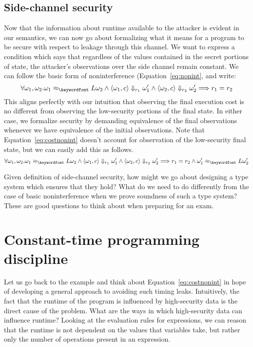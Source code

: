 \documentclass[11pt,twoside]{scrartcl}
\begin{document}
\subsection{Side-channel security}

Now that the information about runtime available to the attacker is evident in our semantics, we can now go about formalizing what it means for a program to be secure with respect to leakage through this channel. We want to express a condition which says that regardless of the values contained in the secret portions of state, the attacker's observations over the side channel remain constant. We can follow the basic form of noninterference (Equation~\ref{eq:nonint}, and write:
\begin{equation}
\label{eq:costnonint}
\forall \omega_1,\omega_2 . \omega_1 \approx_\lowt \omega_2 \land \langle \omega_1, c\rangle \Downarrow_{r_1} \omega_1' \land \langle\omega_2, c\rangle\Downarrow_{r_2}\omega_2' \Longrightarrow r_1 = r_2
\end{equation}
This aligns perfectly with our intuition that observing the final execution cost is no different from observing the low-security portions of the final state. In either case, we formalize security by demanding equivalence of the final observations whenever we have equivalence of the initial observations. Note that Equation~\ref{eq:costnonint} doesn't account for observation of the low-security final state, but we can easily add this as follows.
\begin{equation}
\label{eq:costfull}
\forall \omega_1,\omega_2 . \omega_1 \approx_\lowt \omega_2 \land \langle \omega_1, c\rangle \Downarrow_{r_1} \omega_1' \land \langle\omega_2, c\rangle\Downarrow_{r_2}\omega_2' \Longrightarrow r_1 = r_2 \land \omega_1' \approx_\lowt \omega_2'
\end{equation}

Given definition of side-channel security, how might we go about designing a type system which ensures that they hold? What do we need to do differently from the case of basic noninterference when we prove soundness of such a type system? These are good questions to think about when preparing for an exam.

\section{Constant-time programming discipline}

Let us go back to the  example and think about Equation~\ref{eq:costnonint} in hope of developing a general approach to avoiding such timing leaks. Intuitively, the fact that the runtime of the program is influenced by high-security data is the direct cause of the problem. What are the ways in which high-security data can influence runtime? Looking at the evaluation rules for expressions, we can reason that the runtime is not dependent on the values that variables take, but rather only the number of operations present in an expression.
\end{document}
